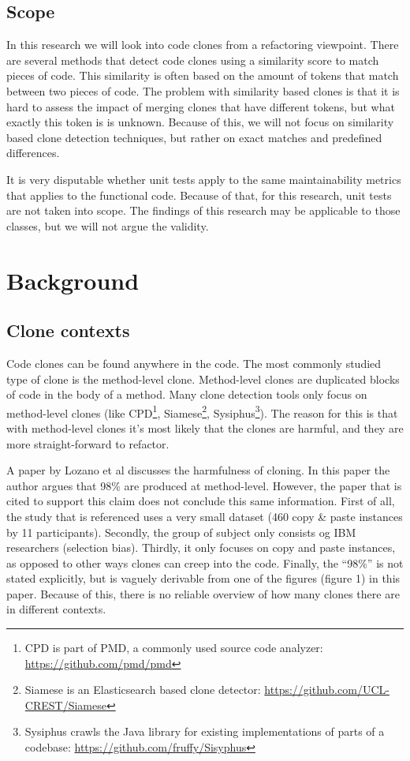 \documentclass{report}
\theoremstyle{definition}
\theoremstyle{remark}
\begin{document}
\section{Scope}
In this research we will look into code clones from a refactoring viewpoint. There are several methods that detect code clones using a similarity score to match pieces of code. This similarity is often based on the amount of tokens that match between two pieces of code. The problem with similarity based clones is that it is hard to assess the impact of merging clones that have different tokens, but what exactly this token is is unknown. Because of this, we will not focus on similarity based clone detection techniques, but rather on exact matches and predefined differences.

It is very disputable whether unit tests apply to the same maintainability metrics that applies to the functional code. Because of that, for this research, unit tests are not taken into scope. The findings of this research may be applicable to those classes, but we will not argue the validity. %

\chapter{Background}
\section{Clone contexts}
Code clones can be found anywhere in the code. The most commonly studied type of clone is the method-level clone. Method-level clones are duplicated blocks of code in the body of a method. Many clone detection tools only focus on method-level clones (like CPD\footnote{CPD is part of PMD, a commonly used source code analyzer: \url{https://github.com/pmd/pmd}}, Siamese\footnote{Siamese is an Elasticsearch based clone detector: \url{https://github.com/UCL-CREST/Siamese}}, Sysiphus\footnote{Sysiphus crawls the Java library for existing implementations of parts of a codebase: \url{https://github.com/fruffy/Sisyphus}}). The reason for this is that with method-level clones it's most likely that the clones are harmful, and they are more straight-forward to refactor.

A paper by Lozano et al \cite{lozano2007evaluating} discusses the harmfulness of cloning. In this paper the author argues that 98\% are produced at method-level. However, the paper that is cited to support this claim \cite{bergman2004ethnographic} does not conclude this same information. First of all, the study that is referenced uses a very small dataset (460 copy & paste instances by 11 participants). Secondly, the group of subject only consists og IBM researchers (selection bias). Thirdly, it only focuses on copy and paste instances, as opposed to other ways clones can creep into the code. Finally, the ``98\%'' is not stated explicitly, but is vaguely derivable from one of the figures (figure 1) in this paper. Because of this, there is no reliable overview of how many clones there are in different contexts.
\end{document}
